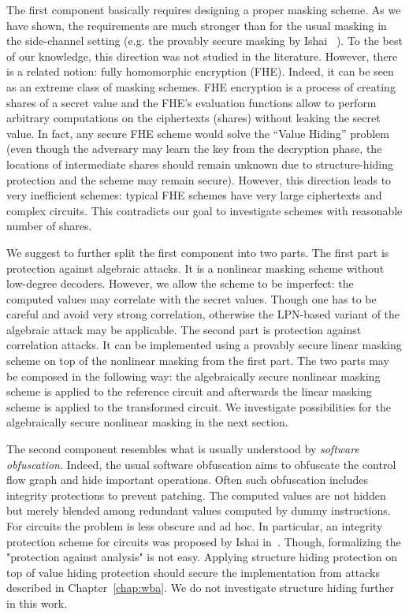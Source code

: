 The first component basically requires designing a proper masking scheme. As we have shown, the requirements are much stronger than for the usual masking in the side-channel setting (e.g. the provably secure masking by Ishai \etal{}~\cite{PrivCircuits1}). To the best of our knowledge, this direction was not studied in the literature. However, there is a related notion: fully homomorphic encryption (FHE). Indeed, it can be seen as an extreme class of masking schemes. FHE encryption is a process of creating shares of a secret value and the FHE's evaluation functions allow to perform arbitrary computations on the ciphertexts (shares) without leaking the secret value. In fact, any secure FHE scheme would solve the ``Value Hiding'' problem (even though the adversary may learn the key from the decryption phase, the locations of intermediate shares should remain unknown due to structure-hiding protection and the scheme may remain secure). However, this direction leads to very inefficient schemes: typical FHE schemes have very large ciphertexts and complex circuits. This contradicts our goal to investigate schemes with reasonable number of shares.

We suggest to further split the first component into two parts. The first part is protection against algebraic attacks. It is a nonlinear masking scheme without low-degree decoders. However, we allow the scheme to be imperfect: the computed values may correlate with the secret values. Though one has to be careful and avoid very strong correlation, otherwise the LPN-based variant of the algebraic attack may be applicable. The second part is protection against correlation attacks. It can be implemented using a provably secure linear masking scheme on top of the nonlinear masking from the first part. The two parts may be composed in the following way: the algebraically secure nonlinear masking scheme is applied to the reference circuit and afterwards the linear masking scheme is applied to the transformed circuit. 
We investigate possibilities for the algebraically secure nonlinear masking in the next section. 

The second component resembles what is usually understood by \emph{software obfuscation}. Indeed, the usual software obfuscation aims to obfuscate the control flow graph and hide important operations. Often such obfuscation includes integrity protections to prevent patching. The computed values are not hidden but merely blended among redundant values computed by dummy instructions. For circuits the problem is less obscure and ad hoc. In particular, an integrity protection scheme for circuits was proposed by Ishai \etal{} in~\cite{PrivCircuits2}. Though, formalizing the "protection against analysis" is not easy. Applying structure hiding protection on top of value hiding protection should secure the implementation from attacks described in Chapter~\ref{chap:wba}. We do not investigate structure hiding further in this work.

